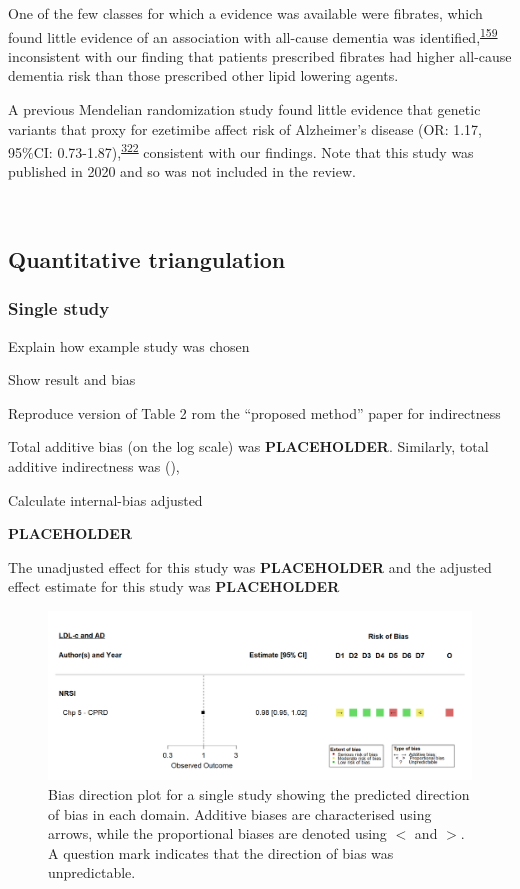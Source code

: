 \documentclass[a4paper, twoside]{templates/ociamthesis}
\begin{document}
One of the few classes for which a evidence was available were fibrates, which found little evidence of an association with all-cause dementia was identified,\textsuperscript{\protect\hyperlink{ref-ancelin2012}{159}} inconsistent with our finding that patients prescribed fibrates had higher all-cause dementia risk than those prescribed other lipid lowering agents.

A previous Mendelian randomization study found little evidence that genetic variants that proxy for ezetimibe affect risk of Alzheimer's disease (OR: 1.17, 95\%CI: 0.73-1.87),\textsuperscript{\protect\hyperlink{ref-williams2020}{322}} consistent with our findings. Note that this study was published in 2020 and so was not included in the review.

~

\hypertarget{quantitative-triangulation-1}{%
\subsection{Quantitative triangulation}\label{quantitative-triangulation-1}}

\hypertarget{single-study}{%
\subsubsection{Single study}\label{single-study}}

Explain how example study was chosen

Show result and bias

Reproduce version of Table 2 rom the ``proposed method'' paper for indirectness

Total additive bias (on the log scale) was \textbf{PLACEHOLDER}. Similarly, total additive indirectness was (),

Calculate internal-bias adjusted

\textbf{PLACEHOLDER}

The unadjusted effect for this study was \textbf{PLACEHOLDER} and the adjusted effect estimate for this study was \textbf{PLACEHOLDER}





\begin{figure}[H]
\includegraphics[width=1\linewidth]{figures/tri/midlife_AD_single} \caption[Bias direction plot for a single study]{Bias direction plot for a single study showing the predicted direction of bias in each domain. Additive biases are characterised using arrows, while the proportional biases are denoted using \(<\) and \(>\). A question mark indicates that the direction of bias was unpredictable.}\label{fig:biasDirectionSingle}
\end{figure}
\end{document}
